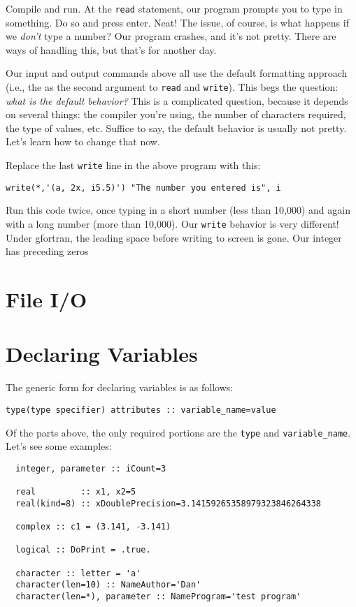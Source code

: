 \documentclass[11pt, letterpaper]{article}
\begin{document}
Compile and run.  At the {\tt read} statement, our program prompts you to type
in something.  Do so and press enter.  Neat!  The issue, of course, is what
happens if we \emph{don't} type a number?  Our program crashes, and it's not
pretty.  There are ways of handling this, but that's for another day.

Our input and output commands above all use the default formatting approach
(i.e., the {\tt *} as the second argument to {\tt read} and {\tt write}).  This
begs the question: \emph{what is the default behavior?}  This is a complicated
question, because it depends on several things: the compiler you're using, the
number of characters required, the type of values, etc.  Suffice to say, the
default behavior is usually not pretty.  Let's learn how to change that now.

Replace the last {\tt write} line in the above program with this:

\begin{verbatim}
write(*,'(a, 2x, i5.5)') "The number you entered is", i
\end{verbatim}

Run this code twice, once typing in a short number (less than 10,000) and again
with a long number (more than 10,000).
Our {\tt write} behavior is very different!  Under gfortran, the leading space
before writing to screen is gone.  Our integer has preceding zeros 

\section{File I/O}

\section{Declaring Variables}

The generic form for declaring variables is as follows:
\begin{verbatim}
type(type specifier) attributes :: variable_name=value
\end{verbatim}
Of the parts above, the only required portions are the \texttt{type} and
\texttt{variable\_name}.  Let's see some examples:

\begin{verbatim}
  integer, parameter :: iCount=3

  real         :: x1, x2=5
  real(kind=8) :: xDoublePrecision=3.14159265358979323846264338
  
  complex :: c1 = (3.141, -3.141)

  logical :: DoPrint = .true.

  character :: letter = 'a'
  character(len=10) :: NameAuthor='Dan' 
  character(len=*), parameter :: NameProgram='test program'
\end{verbatim}
\end{document}
